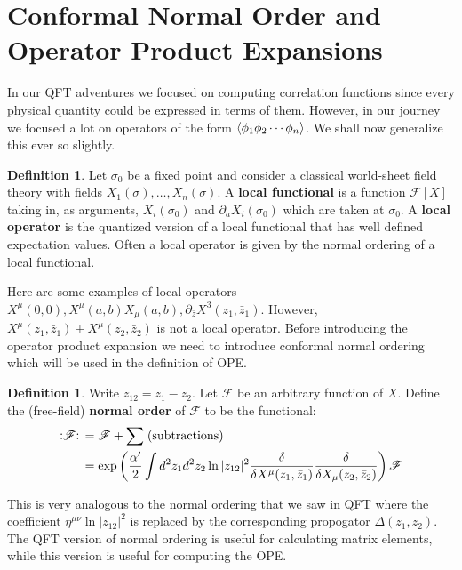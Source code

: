 \documentclass{report}
\theoremstyle{plain}
\theoremstyle{definition}
\newtheorem{definition}[theorem]{Definition}
\theoremstyle{remark}
\newcommand{\FR}[2]{\frac{#1}{#2}}
\newcommand{\ms}{\mathscr}
\newcommand{\sg}{\sigma}
\newcommand{\di}{\partial}
\newcommand{\NO}[1]{\vcentcolon\mathrel{#1}\vcentcolon\,}
\begin{document}
\section{Conformal Normal Order and Operator Product Expansions}

In our QFT adventures we focused on computing correlation functions since
every physical quantity could be expressed in terms of them. However, in
our journey we focused a lot on operators of the form
$\braket{\phi_1\phi_2\cdots\phi_n}$. We shall now generalize this ever so
slightly. 

\begin{definition} Let $\sg_0$ be a fixed point and consider a classical
world-sheet field theory with fields $X_1(\sg),\ldots,X_n(\sg)$. A
\textbf{local functional} is a function
$\ms F[X]$ taking in, as arguments, $X_i(\sg_0)$ and $\di_a
X_i(\sg_0)$ which are taken at $\sg_0$. A \textbf{local operator} is the
quantized version of a local functional that has well defined expectation
values. Often a local operator is given by the normal ordering of a local
functional.
\end{definition}
Here are some examples of local operators $X^\mu(0,0),
X^\mu(a,b)X_\mu(a,b), \di_{\bar z}X^3(z_1,\bar z_1)$. However,
$X^\mu(z_1,\bar z_1)+X^\mu(z_2,\bar z_2)$ is not a local operator.  Before
introducing the operator product expansion we need to introduce conformal
normal ordering which will be used in the definition of OPE.

\begin{definition}
  Write $z_{12} = z_1 - z_2$. Let $\ms F$ be an arbitrary function of
  $X$. Define the (free-field) {\bf normal order} of $\ms F$ to be the
  functional:
  \begin{align}
  \label{normalorderdefinition}
  \NO{\ms F} &= \ms F + \sum \;(\text{subtractions})\\
  &= \exp \left( \FR{\alpha'}{2}\int d^2z_1d^2z_2 \ln|z_{12}|^2
  \FR{\delta}{\delta X^\mu(z_1,\bar z_1)}
  \FR{\delta}{\delta X_\mu(z_2,\bar z_2)} \right) \ms F
  \end{align}
\end{definition}
This is very analogous to the normal ordering that we saw in QFT where the
coefficient $\eta^{\mu\nu}\ln|z_{12}|^2$ is replaced by the corresponding
propogator $\Delta(z_1,z_2)$. The QFT version of normal ordering is useful
for calculating matrix elements, while this version is useful for computing
the OPE.
\end{document}
